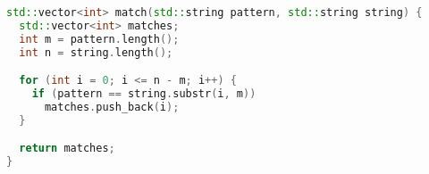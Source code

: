 \begin{lstlisting}[language=C++,caption={C++ naive implementation},label={lst:naive_cpp}]
std::vector<int> match(std::string pattern, std::string string) {
  std::vector<int> matches;
  int m = pattern.length();
  int n = string.length();

  for (int i = 0; i <= n - m; i++) {
    if (pattern == string.substr(i, m))
      matches.push_back(i);
  }

  return matches;
}
\end{lstlisting}

